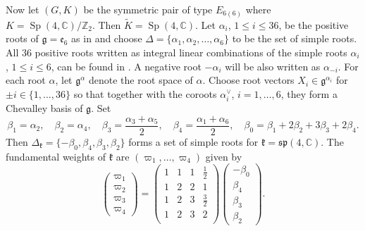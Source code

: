 \documentclass[12pt]{amsart}
\newcommand{\C}{\mathbb{C}}
\newcommand{\g}{\mathfrak{g}}
\newcommand{\Z}{\mathbb{Z}}
\newcommand{\kf}{\mathfrak{k}}
\newcommand{\Sp}{\operatorname{Sp}}
\theoremstyle{definition}
\numberwithin{equation}{section}
\begin{document}
Now let $(G, K)$ be the symmetric pair of type $E_{6(6)}$ where $K = \Sp(4, \C)/\Z_2$. Then $\tilde{K} = \Sp(4, \C)$. Let $\alpha_i$, $1 \leqslant i \leqslant 36$, be the positive roots of $\g = \mathfrak{e}_6$ as in \cite{Dk2} and choose $\Delta = \{ \alpha_1, \alpha_2, \ldots, \alpha_6 \}$ to be the set of simple roots. All $36$ positive roots written as integral linear combinations of the simple roots $\alpha_i$, $1 \leqslant i \leqslant 6$, can be found in \cite[Table 13]{Dk2}. A negative root $-\alpha_i$ will be also written as $\alpha_{-i}$. For each root $\alpha$, let $\g^\alpha$ denote the root space of $\alpha$. Choose root vectors $X_i \in \g^{\alpha_i}$ for $\pm i \in \{ 1, \ldots, 36\}$ so that together with the coroots $\alpha^\vee_i$, $i= 1, \dots, 6$, they form a Chevalley basis of $\g$. Set
\[ \beta_1 = \alpha_2, \quad \beta_2 = \alpha_4, \quad \beta_3 = \frac{\alpha_3 + \alpha_5}{2}, \quad \beta_4 = \frac{\alpha_1 + \alpha_6}{2} , \quad \beta_0 = \beta_1 + 2 \beta_2 + 3 \beta_3 + 2 \beta_4. \]
Then $\Delta_\kf = \{-\beta_0, \beta_4, \beta_3, \beta_2 \}$ forms a set of simple roots for $\kf = \mathfrak{sp}(4,\C)$. The fundamental weights of $\kf$ are $(\varpi_1, \ldots, \varpi_4)$ given by
\[
\begin{pmatrix}
	\varpi_1 \\ \varpi_2 \\ \varpi_3 \\ \varpi_4
\end{pmatrix}
=
\begin{pmatrix}
	1  &  1  &  1  &  \frac{1}{2}   \\
	1  &  2  &  2 &   1  \\
	1  &  2  &  3  &   \frac{3}{2}  \\
	1  &  2  &  3  &   2 \\
\end{pmatrix}
\begin{pmatrix}
	-\beta_0 \\ \beta_4 \\ \beta_3 \\ \beta_2
\end{pmatrix}.
\]
\end{document}

